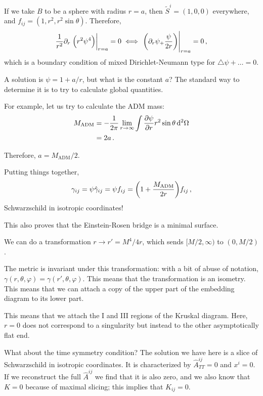 \documentclass[main.tex]{subfiles}
\begin{document}
If we take \(B\) to be a sphere with radius \(r=a\), then \(\widetilde{S}^{i} = (1, 0, 0)\) everywhere, and \(f_{ij} = (1, r^2, r^2 \sin \theta )\). 
Therefore, 
%
\begin{align}
\frac{1}{r^2} \partial_{r} \eval{\qty(r^2 \psi^{4})}_{r=a} = 0
\iff \eval{\qty(\partial_{r} \psi_+ \frac{\psi}{2r})}_{r=a} = 0
\,,
\end{align}
%
which is a boundary condition of mixed Dirichlet-Neumann type for \(\triangle \psi + \dots = 0\).

A solution is \(\psi = 1+ a/r\), but what is the constant \(a\)?
The standard way to determine it is to try to calculate global quantities.

For example, let us try to calculate the ADM mass: 
%
\begin{align}
M _{\text{ADM}} &= - \frac{1}{2 \pi } \lim_{r \to \infty}
\int \pdv{\psi }{r} r^2 \sin \theta \dd[2]{\Omega}  \\
&= 2 a
\,.
\end{align}

Therefore, \(a = M _{\text{ADM}} / 2\). 

Putting things together, 
%
\begin{align}
\gamma_{ij} = \psi \hat{\gamma}_{ij} = \psi f_{ij} = \qty(1 + \frac{M _{\text{ADM}}}{2r}) f_{ij}
\,,
\end{align}
%
Schwarzschild in isotropic coordinates!

This also proves that the Einstein-Rosen bridge is a minimal surface. 


We can do a transformation \(r \to r' = M^{4} / 4r\), which sends \([M/2, \infty )\) to \((0, M/2)\). 

The metric is invariant under this transformation: with a bit of abuse of notation, \(\gamma (r, \theta , \varphi ) = \gamma (r', \theta , \varphi )\). This means that the transformation is an isometry. 
This means that we can attach a copy of the upper part of the embedding diagram to its lower part.  

This means that we attach the I and III regions of the Kruskal diagram. 
Here, \(r = 0\) does not correspond to a singularity but instead to the other asymptotically flat end. 

What about the time symmetry condition? The solution we have here is a slice of Schwarzschild in isotropic coordinates. It is characterized by \(\hat{A}_{TT}^{ij} = 0\) and \(x^{i} =0 \). 
If we reconstruct the full \(\hat{A}^{ij}\) we find that it is also zero, and we also know that \(K = 0\) because of maximal slicing; this implies that \(K_{ij} = 0\).
\end{document}
